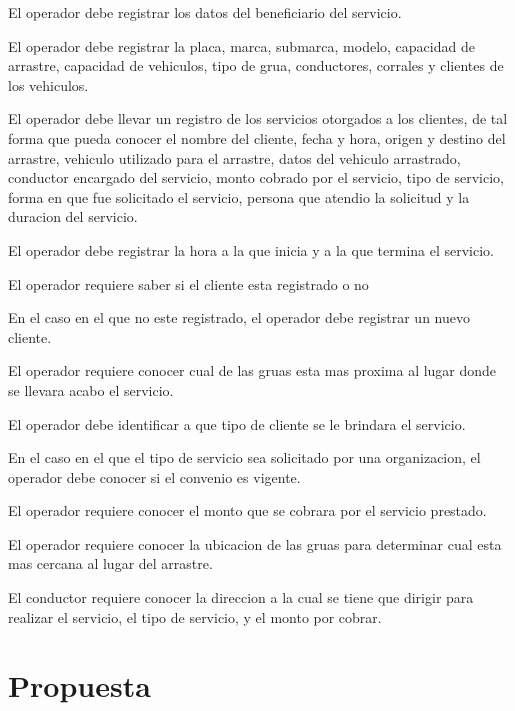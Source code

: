\begin{description}
\item El operador debe registrar los datos del beneficiario del servicio.
\item El operador debe registrar la placa, marca, submarca, modelo, capacidad de arrastre, capacidad de vehiculos, tipo de grua, conductores, corrales y clientes  de los vehiculos.
\item El operador debe llevar un registro de los servicios otorgados a los clientes, de tal forma que pueda conocer el nombre del cliente, fecha y hora, origen y destino del arrastre, vehiculo utilizado para el arrastre, datos del vehiculo arrastrado, conductor encargado del servicio, monto cobrado por el servicio, tipo de servicio, forma en que fue solicitado el servicio, persona que atendio la solicitud y la duracion del servicio.
\item El operador debe registrar la hora a la que inicia y a la que termina el servicio.
\item El operador requiere saber si el cliente esta registrado o no 
\item En el caso en el que no este registrado, el operador debe registrar un nuevo cliente.
\item El operador requiere conocer cual de las gruas esta mas proxima al lugar donde se llevara acabo el servicio.
\item El operador debe identificar a que tipo de cliente se le brindara el servicio.
\item En el caso en el que el tipo de servicio sea solicitado por una organizacion, el operador debe conocer si el convenio es vigente.
\item El operador requiere conocer el monto que se cobrara por el servicio prestado.
\item El operador requiere conocer la ubicacion de las gruas para determinar cual esta mas cercana al lugar del arrastre.
\item El conductor requiere conocer la direccion a la cual se tiene que dirigir para realizar el servicio, el tipo de servicio, y el monto por cobrar.



\end{description}
\section{Propuesta}

